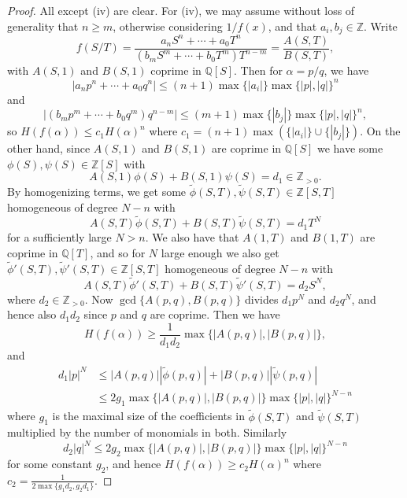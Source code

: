\documentclass[a4paper]{article}
\theoremstyle{plain}
\theoremstyle{remark}
\theoremstyle{definition}
\newcommand{\Z}{\mathbb{Z}}
\newcommand{\Q}{\mathbb{Q}}
\begin{document}
\begin{proof}
    All except (iv) are clear. For (iv), we may assume without loss of
    generality that $n\ge m$, otherwise considering $1/f(x)$, and that
    $a_i,b_j\in\Z$. Write
    \begin{equation*}
        f(S/T)
            = \frac{a_nS^n+\cdots+a_0T^n}{(b_mS^m+\cdots+b_0T^m)T^{n-m}}
            = \frac{A(S,T)}{B(S,T)},
    \end{equation*}
    with $A(S,1)$ and $B(S,1)$ coprime in $\Q[S]$. Then for $\alpha=p/q$, we
    have
    \begin{equation*}
        |a_np^n+\cdots+a_0q^n|
            \le (n+1)\max\{|a_i|\}\max\{|p|,|q|\}^n
    \end{equation*}
    and
    \begin{equation*}
        |(b_mp^m+\cdots+b_0q^m)q^{n-m}|
            \le (m+1)\max\{|b_j|\}\max\{|p|,|q|\}^n,
    \end{equation*}
    so $H(f(\alpha))\le c_1H(\alpha)^n$ where
    $c_1=(n+1)\max(\{|a_i|\}\cup\{|b_j|\})$. On the other hand, since $A(S,1)$
    and $B(S,1)$ are coprime in $\Q[S]$ we have some $\phi(S),\psi(S)\in\Z[S]$
    with
    \begin{equation*}
        A(S,1)\phi(S)+B(S,1)\psi(S) = d_1\in\Z_{>0}.
    \end{equation*}
    By homogenizing terms, we get some
    $\tilde\phi(S,T),\tilde\psi(S,T)\in\Z[S,T]$ homogeneous of degree $N-n$ with
    \begin{equation*}
        A(S,T)\tilde\phi(S,T) + B(S,T)\tilde\psi(S,T) = d_1T^N
    \end{equation*}
    for a sufficiently large $N>n$. We also have that $A(1,T)$ and $B(1,T)$ are
    coprime in $\Q[T]$, and so for $N$ large enough we also get
    $\tilde\phi'(S,T),\tilde\psi'(S,T)\in\Z[S,T]$ homogeneous of degree $N-n$
    with
    \begin{equation*}
        A(S,T)\tilde\phi'(S,T) + B(S,T)\tilde\psi'(S,T) = d_2S^N,
    \end{equation*}
    where $d_2\in\Z_{>0}$. Now $\gcd\{A(p,q),B(p,q)\}$ divides $d_1p^N$ and
    $d_2q^N$, and hence also $d_1d_2$ since $p$ and $q$ are coprime. Then we
    have
    \begin{equation*}
        H(f(\alpha)) \ge \frac{1}{d_1d_2}\max\{|A(p,q)|,|B(p,q)|\},
    \end{equation*}
    and
    \begin{align*}
        d_1|p|^N
            &\le |A(p,q)||\tilde\phi(p,q)| + |B(p,q)||\tilde\psi(p,q)| \\
            &\le 2g_1\max\{|A(p,q)|,|B(p,q)|\}\max\{|p|,|q|\}^{N-n}
    \end{align*}
    where $g_1$ is the maximal size of the coefficients in $\tilde\phi(S,T)$ and
    $\tilde\psi(S,T)$ multiplied by the number of monomials in both. Similarly
    \begin{equation*}
        d_2|q|^N \le 2g_2\max\{|A(p,q)|,|B(p,q)|\}\max\{|p|,|q|\}^{N-n}
    \end{equation*}
    for some constant $g_2$, and hence $H(f(\alpha))\ge c_2H(\alpha)^n$ where
    $c_2=\frac{1}{2\max\{g_1d_2,g_2d_1\}}$.
\end{proof}
\end{document}
